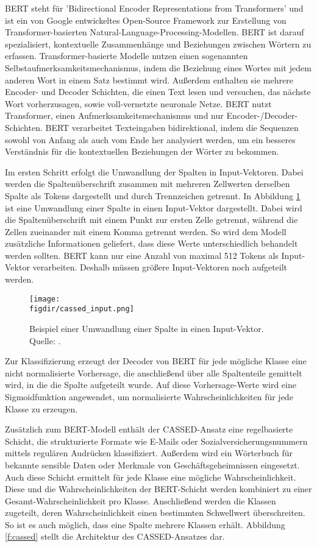 BERT steht für 'Bidirectional Encoder Representations from Transformers' und ist ein von Google entwickeltes Open-Source Framework zur Erstellung von Transformer-basierten Natural-Language-Processing-Modellen. BERT ist darauf spezialisiert, kontextuelle Zusammenhänge und Beziehungen zwischen Wörtern zu erfassen. Transformer-basierte Modelle nutzen einen sogenannten Selbstaufmerksamkeitsmechanismus, indem die Beziehung eines Wortes mit jedem anderen Wort in einem Satz bestimmt wird. Außerdem enthalten sie mehrere Encoder- und Decoder Schichten, die einen Text lesen und versuchen, das nächste Wort vorherzusagen, sowie voll-vernetzte neuronale Netze. BERT nutzt Transformer, einen Aufmerksamkeitsmechanismus und nur Encoder-/Decoder-Schichten. BERT verarbeitet Texteingaben bidirektional, indem die Sequenzen sowohl von Anfang als auch vom Ende her analysiert werden, um ein besseres Verständnis für die kontextuellen Beziehungen der Wörter zu bekommen.

Im ersten Schritt erfolgt die Umwandlung der Spalten in Input-Vektoren. Dabei werden die Spaltenüberschrift zusammen mit mehreren Zellwerten derselben Spalte als Tokens dargestellt und durch Trennzeichen getrennt. In Abbildung \ref{f:input} ist eine Umwandlung einer Spalte in einen Input-Vektor dargestellt. Dabei wird die Spaltenüberschrift mit einem Punkt zur ersten Zelle getrennt, während die Zellen zueinander mit einem Komma getrennt werden. So wird dem Modell zusätzliche Informationen geliefert, dass diese Werte unterschiedlich behandelt werden sollten. BERT kann nur eine Anzahl von maximal 512 Tokens als Input-Vektor verarbeiten. Deshalb müssen größere Input-Vektoren noch aufgeteilt werden.

\begin{figure}[htbp]
    \centering
    \texttt{[image: \\figdir/cassed\_input.png]}
    \caption{Beispiel einer Umwandlung einer Spalte in einen Input-Vektor. Quelle: \cite{Kuzina.2023}.}
    \label{f:input}
\end{figure}

Zur Klassifizierung erzeugt der Decoder von BERT für jede mögliche Klasse eine nicht normalisierte Vorhersage, die anschließend über alle Spaltenteile gemittelt wird, in die die Spalte aufgeteilt wurde. Auf diese Vorhersage-Werte wird eine Sigmoidfunktion angewendet, um normalisierte Wahrscheinlichkeiten für jede Klasse zu erzeugen.

Zusätzlich zum BERT-Modell enthält der CASSED-Ansatz eine regelbasierte Schicht, die strukturierte Formate wie E-Mails oder Sozialversicherungsnummern mittels regulären Audrücken klassifiziert. Außerdem wird ein Wörterbuch für bekannte sensible Daten oder Merkmale von Geschäftsgeheimnissen eingesetzt. Auch diese Schicht ermittelt für jede Klasse eine mögliche Wahrscheinlichkeit. Diese und die Wahrscheinlichkeiten der BERT-Schicht werden kombiniert zu einer Gesamt-Wahrscheinlichkeit pro Klasse. Anschließend werden die Klassen zugeteilt, deren Wahrscheinlichkeit einen bestimmten Schwellwert überschreiten. So ist es auch möglich, dass eine Spalte mehrere Klassen erhält. Abbildung \ref{f:cassed} stellt die Architektur des CASSED-Ansatzes dar.

